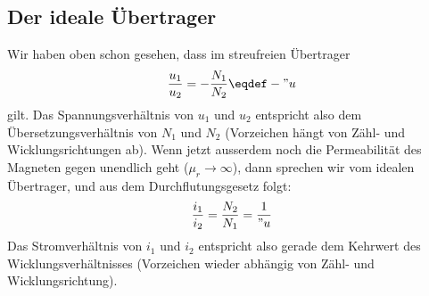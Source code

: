 \subsection{Der ideale Übertrager}
Wir haben oben schon gesehen, dass im streufreien Übertrager $$\frac{u_1}{u_2} = -\frac{N_1}{N_2} \eqdef -"u$$ gilt. Das Spannungsverhältnis von $u_1$ und $u_2$ entspricht also dem Übersetzungsverhältnis von $N_1$ und $N_2$ (Vorzeichen hängt von Zähl- und Wicklungsrichtungen ab). Wenn jetzt ausserdem noch die Permeabilität des Magneten gegen unendlich geht ($\mu_r \rightarrow \infty$), dann sprechen wir vom idealen Übertrager, und aus dem Durchflutungsgesetz folgt: $$\frac{i_1}{i_2}=\frac{N_2}{N_1} = \frac{1}{"u}$$
Das Stromverhältnis von $i_1$ und $i_2$ entspricht also gerade dem Kehrwert des Wicklungsverhältnisses (Vorzeichen wieder abhängig von Zähl- und Wicklungsrichtung). \newline

